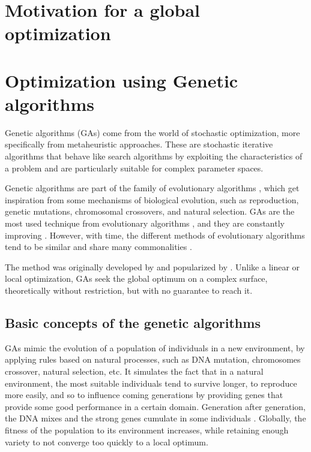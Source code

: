 \documentclass[twocol]{ametsoc}
\begin{document}
\section{Motivation for a global optimization}


\section{Optimization using Genetic algorithms}
\label{sec:gas}

Genetic algorithms (GAs) come from the world of stochastic optimization, more specifically from metaheuristic approaches. These are stochastic iterative algorithms that behave like search algorithms by exploiting the characteristics of a problem and are particularly suitable for complex parameter spaces.

Genetic algorithms are part of the family of evolutionary algorithms \citep{Back1993b, Schwefel1993}, which get inspiration from some mechanisms of biological evolution, such as reproduction, genetic mutations, chromosomal crossovers, and natural selection. GAs are the most used technique from evolutionary algorithms \citep{Back1993b}, and they are constantly improving \citep{Haupt2004}. However, with time, the different methods of evolutionary algorithms tend to be similar and share many commonalities \citep{Back1996b, Haupt2004}.

The method was originally developed by \citet{Holland1992b} and popularized by \citet{Goldberg1989}. Unlike a linear or local optimization, GAs seek the global optimum on a complex surface, theoretically without restriction, but with no guarantee to reach it.


\subsection{Basic concepts of the genetic algorithms}

GAs mimic the evolution of a population of individuals in a new environment, by applying rules based on natural processes, such as DNA mutation, chromosomes crossover, natural selection, etc. It simulates the fact that in a natural environment, the most suitable individuals tend to survive longer, to reproduce more easily, and so to influence coming generations by providing genes that provide some good performance in a certain domain. Generation after generation, the DNA mixes and the strong genes cumulate in some individuals \citep{Beasley1996a}. Globally, the fitness of the population to its environment increases, while retaining enough variety to not converge too quickly to a local optimum.
\end{document}
